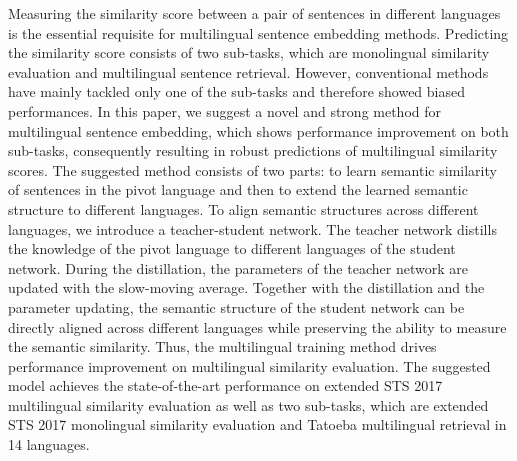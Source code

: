 Measuring the similarity score between a pair of sentences in different languages is the essential requisite for multilingual sentence embedding methods. Predicting the similarity score consists of two sub-tasks, which are monolingual similarity evaluation and multilingual sentence retrieval. However, conventional methods have mainly tackled only one of the sub-tasks and therefore showed biased performances. In this paper, we suggest a novel and strong method for multilingual sentence embedding, which shows performance improvement on both sub-tasks, consequently resulting in robust predictions of multilingual similarity scores. The suggested method consists of two parts: to learn semantic similarity of sentences in the pivot language and then to extend the learned semantic structure to different languages. To align semantic structures across different languages, we introduce a teacher-student network. The teacher network distills the knowledge of the pivot language to different languages of the student network. During the distillation, the parameters of the teacher network are updated with the slow-moving average. Together with the distillation and the parameter updating, the semantic structure of the student network can be directly aligned across different languages while preserving the ability to measure the semantic similarity. Thus, the multilingual training method drives performance improvement on multilingual similarity evaluation. The suggested model achieves the state-of-the-art performance on extended STS 2017 multilingual similarity evaluation as well as two sub-tasks, which are extended STS 2017 monolingual similarity evaluation and Tatoeba multilingual retrieval in 14 languages.
